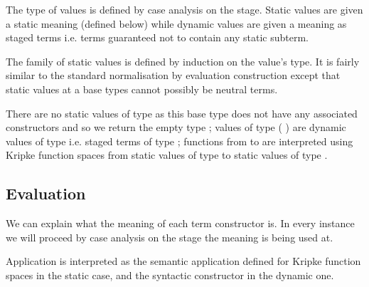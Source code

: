 \documentclass{article}
\begin{document}
The type of values is defined by case analysis on the stage.
%
Static values are given a static meaning (defined below)
while dynamic values are given a meaning as staged terms
i.e. terms guaranteed not to contain any static subterm.


The family of static values is defined by induction on
the value's type. It is fairly similar to the standard
normalisation by evaluation construction
except that static values at a base types cannot possibly
be neutral terms.

\begin{AgdaSuppressSpace}
\end{AgdaSuppressSpace}

There are no static values of type  as this base type does
not have any associated constructors and so we return the empty type ;
values of type ( ) are dynamic values of type 
i.e. staged terms of type ;
functions from  to  are interpreted using Kripke function
spaces from static values of type  to static values of type .






\subsection{Evaluation}

We can explain what the meaning of each term constructor is.
In every instance we will proceed by case analysis on the
stage the meaning is being used at.


Application is interpreted as the semantic application defined
for Kripke function spaces in the static case, and the syntactic
 constructor in the dynamic one.






\begin{AgdaSuppressSpace}
\end{AgdaSuppressSpace}
\end{document}
